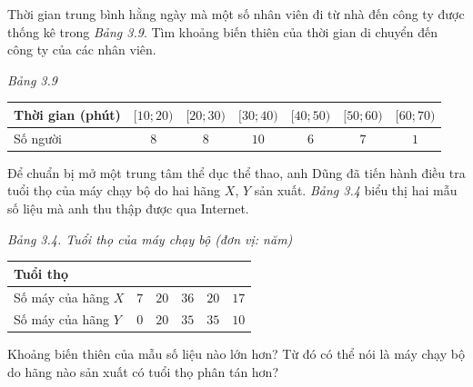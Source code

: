 \begin{bt}[Mức độ 2]%
	Thời gian trung bình hằng ngày mà một số nhân viên đi từ nhà đến công ty được thống kê trong  \textit{Bảng 3.9}. Tìm khoảng biến thiên của thời gian di chuyển đến công ty của các nhân viên.
	\begin{center}
		\textit{	Bảng 3.9}\\
		\begin{tabular}{|l|c|c|c|c|c|c|}
			\hline Thời gian (phút)  & {$[10 ; 20)$} & {$[20 ; 30)$} & {$[30 ; 40)$} & {$[40 ; 50)$} & {$[50 ; 60)$} & {$[60 ; 70)$} \\
			\hline Số người  & $8$ & $8$ & $10$ & $6$ & $7$ & $1$ \\
			\hline
		\end{tabular}
	\end{center}
	
\end{bt}

\begin{bt}[Mức độ 2]%
Để chuẩn bị mở một trung tâm thể dục thể thao, anh Dũng đã tiến hành điều tra tuổi thọ của máy chạy bộ do hai hãng $X$, $Y$ sản xuất. {\it Bảng 3.4} biểu thị hai mẫu số liệu mà anh thu thập được qua Internet.
\begin{center}
	{\it Bảng 3.4. Tuổi thọ của máy chạy bộ (đơn vị: năm)}
	\begin{tabular}{|p{5cm}|p{1.7cm}|p{1.7cm}|p{1.7cm}|p{1.7cm}|p{1.7cm}|}
		\hline Tuổi thọ &\centering\arraybackslash {$[2; 4)$} &\centering\arraybackslash {$[4; 6)$} &\centering\arraybackslash {$[6; 8)$} &\centering\arraybackslash {$[8; 10)$} &\centering\arraybackslash {$[10; 12)$} \\
		\hline Số máy của hãng $X$&\centering\arraybackslash $7$ &\centering\arraybackslash $20$ &\centering\arraybackslash $36$ &\centering\arraybackslash $20$ &\centering\arraybackslash $17$\\
		\hline Số máy của hãng $Y$&\centering\arraybackslash $0$ &\centering\arraybackslash $20$ &\centering\arraybackslash $35$ &\centering\arraybackslash $35$ &\centering\arraybackslash $10$\\
		\hline
	\end{tabular}
\end{center}
Khoảng biến thiên của mẫu số liệu nào lớn hơn? Từ đó có thể nói là máy chạy bộ do hãng nào sản xuất có tuổi thọ phân tán hơn?
\end{bt}

